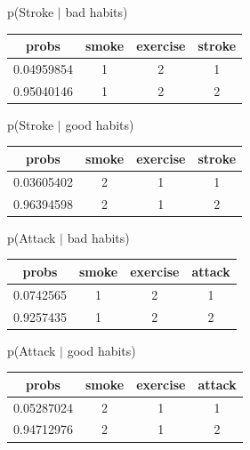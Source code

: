 \documentclass[11pt]{article}
\begin{document}
p(Stroke $|$ bad habits)

\begin{table}[!hbt]
\begin{center}
\begin{tabular}{ |c|c|c|c| }
  \hline
  probs & smoke & exercise & stroke \\
  \hline
  0.04959854 & 1 & 2 & 1 \\
  \hline
  0.95040146 & 1 & 2 & 2 \\
  \hline
\end{tabular}
\end{center}
\end{table}
\vspace{-20pt}

p(Stroke $|$ good habits)

\begin{table}[!hbt]
\begin{center}
\begin{tabular}{ |c|c|c|c| }
  \hline
  probs & smoke & exercise & stroke \\
  \hline
  0.03605402 & 2 & 1 & 1 \\
  \hline
  0.96394598 & 2 & 1 & 2 \\
  \hline
\end{tabular}
\end{center}
\end{table}
\vspace{-20pt}

p(Attack $|$ bad habits)

\begin{table}[!hbt]
\begin{center}
\begin{tabular}{ |c|c|c|c| }
  \hline
  probs & smoke & exercise & attack \\
  \hline
  0.0742565 & 1 & 2 & 1 \\
  \hline
  0.9257435 & 1 & 2 & 2 \\
  \hline
\end{tabular}
\end{center}
\end{table}
\vspace{-20pt}

\clearpage

p(Attack $|$ good habits)

\begin{table}[!hbt]
\begin{center}
\begin{tabular}{ |c|c|c|c| }
  \hline
  probs & smoke & exercise & attack \\
  \hline
  0.05287024 & 2 & 1 & 1 \\
  \hline
 0.94712976 & 2 & 1 & 2 \\
  \hline
\end{tabular}
\end{center}
\end{table}
\vspace{-20pt}
\end{document}
